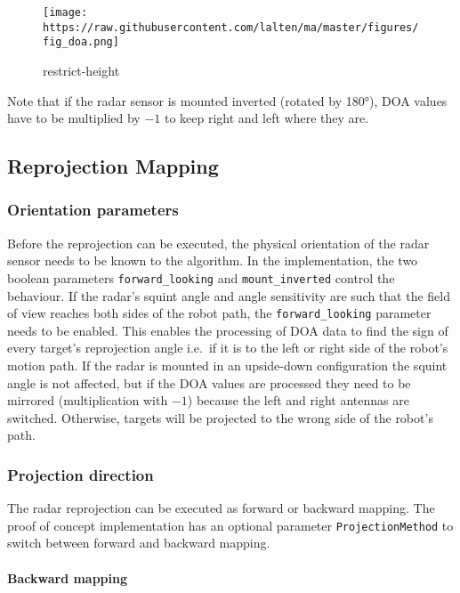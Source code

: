 \begin{figure}
\centering
\texttt{[image: https://raw.githubusercontent.com/lalten/ma/master/figures/fig\_doa.png]}
\caption{restrict-height}
\end{figure}

Note that if the radar sensor is mounted inverted (rotated by 180°), DOA
values have to be multiplied by \(-1\) to keep right and left where they
are.

\subsection{Reprojection Mapping}\label{reprojection-mapping}

\subsubsection{Orientation parameters}\label{orientation-parameters}

Before the reprojection can be executed, the physical orientation of the
radar sensor needs to be known to the algorithm. In the implementation,
the two boolean parameters \texttt{forward\_looking} and
\texttt{mount\_inverted} control the behaviour. If the radar's squint
angle and angle sensitivity are such that the field of view reaches both
sides of the robot path, the \texttt{forward\_looking} parameter needs
to be enabled. This enables the processing of DOA data to find the sign
of every target's reprojection angle i.e.~if it is to the left or right
side of the robot's motion path. If the radar is mounted in an
upside-down configuration the squint angle is not affected, but if the
DOA values are processed they need to be mirrored (multiplication with
\(-1\)) because the left and right antennas are switched. Otherwise,
targets will be projected to the wrong side of the robot's path.

\subsubsection{Projection direction}\label{projection-direction}

The radar reprojection can be executed as forward or backward mapping.
The proof of concept implementation has an optional parameter
\texttt{ProjectionMethod} to switch between forward and backward
mapping.

\paragraph{Backward mapping}\label{backward-mapping}

